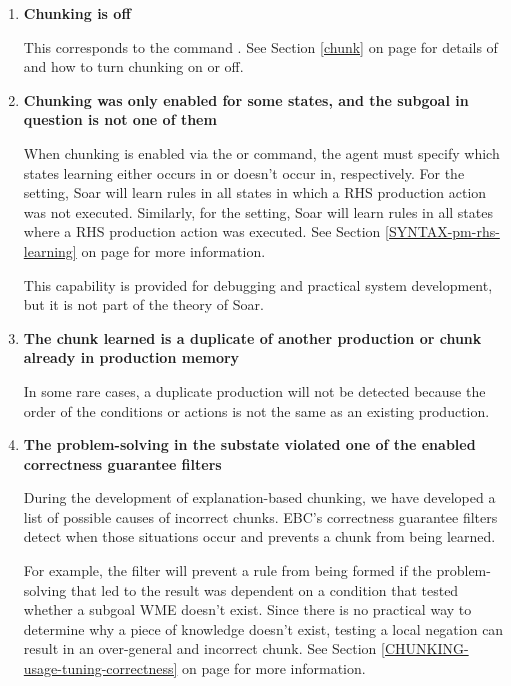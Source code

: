\begin{enumerate}
	\item \textbf{Chunking is off}

	This corresponds to the command .  See Section \ref{chunk} on page \pageref{chunk} for details of  and how to turn chunking on or off.

	\item \textbf{Chunking was only enabled for some states, and the subgoal in question is not one of them}

	When chunking is enabled via the  or  command, the agent must specify which states learning either occurs in or doesn't occur in, respectively.  For the  setting, Soar will learn rules in all states in which a  RHS production action was not executed.  Similarly, for the  setting, Soar will learn rules in all states where a  RHS production action was executed.  See Section \ref{SYNTAX-pm-rhs-learning} on page \pageref{SYNTAX-pm-rhs-learning} for more information.

	This capability is provided for debugging and practical system development, but it is not part of the theory of Soar.

	\item \textbf{The chunk learned is a duplicate of another production or chunk already in production memory}

	In some rare cases, a duplicate production will not be detected because the order of the conditions or actions is not the same as an existing production.

	\item \textbf{The problem-solving in the substate violated one of the enabled correctness guarantee filters}

	During the development of explanation-based chunking, we have developed a list of possible causes of incorrect chunks. EBC's correctness guarantee filters detect when those situations occur and prevents a chunk from being learned.

	For example, the  filter will prevent a rule from being formed if the problem-solving that led to the result was dependent on a condition that tested whether a subgoal WME doesn't exist.  Since there is no practical way to determine why a piece of knowledge doesn't exist, testing a local negation can result in an over-general and incorrect chunk.  See Section \ref{CHUNKING-usage-tuning-correctness} on page \pageref{CHUNKING-usage-tuning-correctness} for more information.


\end{enumerate}
